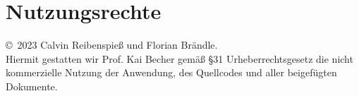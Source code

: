 
\chapter{Nutzungsrechte}

\copyright \, 2023 Calvin Reibenspieß und Florian Brändle.\\
Hiermit gestatten wir Prof. Kai Becher gemäß \S 31 Urheberrechtsgesetz die nicht kommerzielle Nutzung der Anwendung, des Quellcodes und aller beigefügten Dokumente.